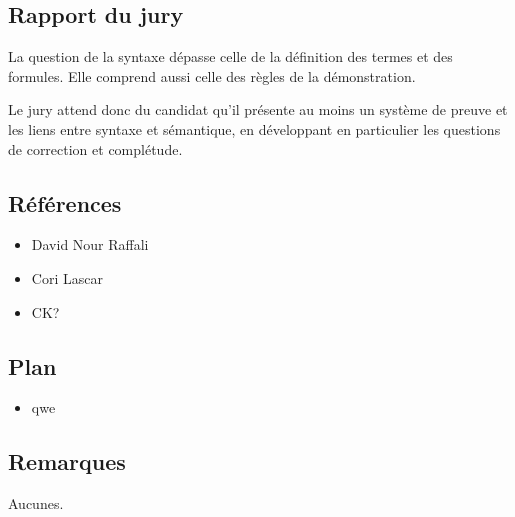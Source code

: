 \documentclass[../../Agregation.tex]{subfiles}
\begin{document}

\subsection{Rapport du jury}

\begin{aquote}{}
La question de la syntaxe dépasse celle de la définition des termes et des formules. Elle comprend aussi celle des règles de la démonstration.

Le jury attend donc du candidat qu'il présente au moins un système de preuve et les liens entre syntaxe et sémantique, en développant en particulier les questions de correction et complétude.
\end{aquote}

\dvts

\subsection{Références}

\begin{itemize}
	\item David Nour Raffali
	\item Cori Lascar
	\item CK?
\end{itemize}

\subsection{Plan}

\begin{itemize}
	\item qwe
\end{itemize}

\subsection{Remarques}

Aucunes.
\end{document}

